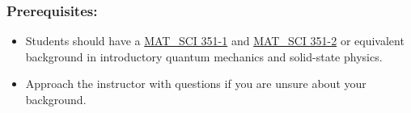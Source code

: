 		\subsubsection*{Prerequisites:} 
			\begin{itemize}
				\item Students should have a \href{https://www.mccormick.northwestern.edu/materials-science/courses/descriptions/351-1.html}{MAT\_SCI 351-1} and \href{https://www.mccormick.northwestern.edu/materials-science/courses/descriptions/351-2.html}{MAT\_SCI 351-2} or equivalent background in introductory quantum mechanics and solid-state physics. 
				\item Approach the instructor with questions if you are unsure about your background.
			\end{itemize}
